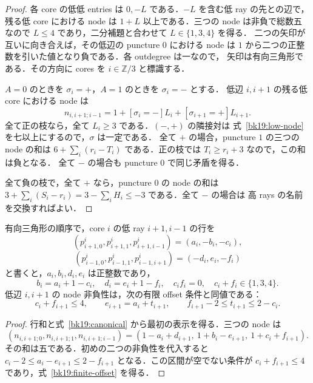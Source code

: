 \begin{proof}
各 core の低低 entries は $0,-L$ である．$-L$ を含む低 ray の先との辺で，
残る低 core における node は $1+L$ 以上である．三つの node は非負で総数五なので
$L\le4$ であり，二分補題と合わせて $L\in\{1,3,4\}$ を得る．
二つの矢印が互いに向き合えば，その低辺の puncture $0$ における node は
$1$ から二つの正整数を引いた値となり負である．各 outdegree は一なので，
矢印は有向三角形である．その方向に cores を $i\in\mathbb Z/3$ と標識する．

$A=0$ のときを $\sigma_i=+$，$A=1$ のときを $\sigma_i=-$ とする．
低辺 $i,i+1$ の残る低 core における node は
\begin{equation}\label{bk19:low-node}
 n_{i,i+1;i-1}=1+[\sigma_i=-]L_i+[\sigma_{i+1}=+]L_{i+1}.
\end{equation}
全て正の枝なら，全て $L_i\ge3$ である．$(-,+)$ の隣接対は
式~\eqref{bk19:low-node} を七以上にするので，$\sigma$ は一定である．
全て $+$ の場合，puncture $1$ の三つの node の和は
$6+\sum_i(r_i-T_i)$ である．正の枝では $T_i\ge r_i+3$ なので，この和は負となる．
全て $-$ の場合も puncture $0$ で同じ矛盾を得る．

全て負の枝で，全て $+$ なら，puncture $0$ の node の和は
$3+\sum_i(S_i-r_i)=3-\sum_iH_i\le-3$ である．全て $-$ の場合は
高 rays の名前を交換すればよい．
\end{proof}

\begin{proposition}\label{bk19:offsets}
有向三角形の順序で，core $i$ の低 ray $i+1,i-1$ の行を
\[
 (p^i_{i+1,0},p^i_{i+1,1},p^i_{i+1,i-1})=(a_i,-b_i,-c_i),
\]
\[
 (p^i_{i-1,0},p^i_{i-1,1},p^i_{i-1,i+1})=(-d_i,e_i,-f_i)
\]
と書くと，$a_i,b_i,d_i,e_i$ は正整数であり，
\[
 b_i=a_i+1-c_i,\quad d_i=e_i+1-f_i,\quad
 c_if_i=0,\quad c_i+f_i\in\{1,3,4\}.
\]
低辺 $i,i+1$ の node 非負性は，次の有限 offset 条件と同値である：
\begin{equation}\label{bk19:finite-offset}
 c_i+f_{i+1}\le4,\qquad
 e_{i+1}=a_i+t_{i+1},\qquad
 f_{i+1}-2\le t_{i+1}\le2-c_i.
\end{equation}
\end{proposition}

\begin{proof}
行和と式~\eqref{bk19:canonical} から最初の表示を得る．三つの node は
\[
 (n_{i,i+1;0},n_{i,i+1;1},n_{i,i+1;i-1})
 =(1-a_i+d_{i+1},\ 1+b_i-e_{i+1},\ 1+c_i+f_{i+1}).
\]
その和は五である．初めの二つの非負性を代入すると
$c_i-2\le a_i-e_{i+1}\le2-f_{i+1}$ となる．この区間が空でない条件が
$c_i+f_{i+1}\le4$ であり，式~\eqref{bk19:finite-offset} を得る．
\end{proof}

